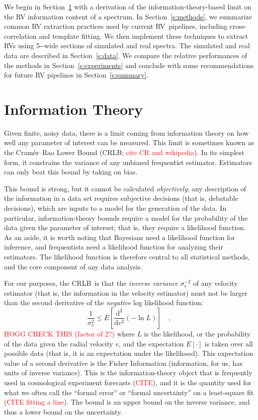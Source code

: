 \documentclass[modern]{aastex631}
\newcommand{\ang}{\text{\normalfont\AA}}
\newcommand{\dd}{\mathrm{d}}
\newcommand{\sectionname}{Section}
\newcommand{\todo}[1]{\textcolor{red}{#1}}  %
\newcommand{\acronym}[1]{{\small{#1}}}
\newcommand{\RV}{\acronym{RV}}
\newcommand{\CRLB}{\acronym{CRLB}}
\begin{document}
We begin in \sectionname~\ref{s:info} with a derivation of the information-theory-based limit on the RV information content of a spectrum. 
In \sectionname~\ref{s:methods}, we summarize common RV extraction practices used by current \RV\ pipelines, including cross-correlation and template fitting. 
We then implement these techniques to extract \RV s using 5-\ang-wide sections of simulated and real spectra.
The simulated and real data are described in \sectionname~\ref{s:data}. 
We compare the relative performances of the methods in \sectionname~\ref{s:experiments} and conclude with some recommendations for future RV pipelines in \sectionname~\ref{s:summary}. 

\section{Information Theory}
\label{s:info}

Given finite, noisy data, there is a limit coming from information
theory on how well any parameter of interest can be measured.
This limit is
sometimes known as the Cram\'er--Rao Lower Bound (\CRLB; \todo{cite CR and wikipedia}).
In its simplest form, it constrains the variance of any unbiased
frequentist estimator.
Estimators can only beat this bound by taking on bias.

This bound is strong, but it cannot be calculated \emph{objectively};
any description of the information in a data set requires
subjective decisions (that is, debatable decisions), which are inputs
to a model for the generation of the data.
In particular, information-theory bounds require a model for the
probability of the data given the parameter of interest; that is, they
require a likelihood function.
As an aside, it is worth noting that
Bayesians need a likelihood function for inference, and
frequentists need a likelihood function for analyzing their estimators.
The likelihood function is therefore central to all statistical methods,
and the core component of any data analysis.

For our purposes, the \CRLB\ is that the \emph{inverse variance} $\sigma_v^{-2}$ of any velocity
estimator (that is, the information in the velocity estimator) must not be larger than the
second derivative of the \emph{negative} log likelihood function:
\begin{equation}
\frac{1}{\sigma_v^2} \leq E\left[\frac{\dd^2}{\dd v^2}(-\ln L)\right] \quad,
\end{equation}
\todo{HOGG CHECK THIS (factor of 2?)}
where $L$ is the likelihood, or the probability of the data given the radial velocity $v$,
and the expectation $E[\cdot]$ is taken over all possible data (that is, it is an
expectation under the likelihood).
This expectation value of a second derivative is the Fisher Information
(information, for us, has units of inverse variance).
This is the information-theory object that is frequently used in
cosmological experiment forecasts (\todo{CITE}),
and it is the quantity used for what we often call the ``formal error'' or
``formal uncertainty'' on a least-square fit (\todo{CITE fitting a line}).
The bound is an upper bound on the inverse variance, and thus a lower bound
on the uncertainty.
\end{document}
